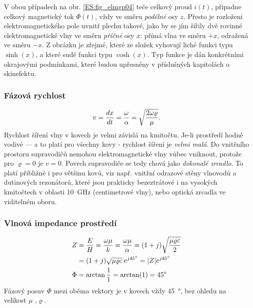         V obou případech na obr. \ref{ES:fig_elmgp04} teče celkový proud \(i(t)\), připadne celkový 
        magnetický tok \(\Phi(t)\), vždy ve směru \emph{podélné} osy \(z\). Přesto je rozloženi 
        elektromagnetického pole uvnitř plechu takové, jako by se jím šířily dvě rovinné 
        elektromagnetické vlny ve směru \emph{příčné} osy \(x\): přímá vlna ve směru \(+x\), 
        odražená ve směru \(-x\). Z obrázku je zřejmé, které ze složek vyhovují liché funkci typu 
        \( 
        \sinh(x)\), a které sudé funkci typu \(\cosh(x)\). Typ funkce je dán konkrétními okrajovými 
        podmínkami, které budou upřesněny v příslušných kapitolách o skinefektu.
       
        \subsubsection{Fázová rychlost}
          \begin{equation}\label{ES:eq_elmagp51}
            v = \dfrac{d x}{d t} = \frac{\omega}{\alpha} 
              = \sqrt{\dfrac{2\omega\varrho}{\mu}}.
          \end{equation}
          Rychlost šíření vlny v kovech je velmi závislá na kmitočtu. Je-li prostředí hodně 
          vodivé — a to platí pro všechny kovy - rychlost šíření je \emph{velmi malá}. Do vnitřního 
          prostoru supravodičů nemohou elektromagnetické vlny vůbec vniknout, protože pro \(\varrho 
          = 0\) je \(v = 0\). Povrch supravodiče se tedy chová jako \emph{dokonalé zrcadlo}. To 
          platí přibližně i pro většinu kovů, viz např. vnitřní odrazové stěny vlnovodů a 
          dutinových rezonátorů, které jsou prakticky bezeztrátové i na vysokých kmitočtech v 
          oblasti \SI{10}{\GHz} (centimetrové vlny), nebo optická zrcadla ve viditelném oboru.

        \subsubsection{Vlnová impedance prostředí}
          \begin{subequations}
            \begin{align}
                Z &= \frac{E}{H} = \frac{\omega\mu}{k} 
                   = \frac{\omega\mu}{\alpha} 
                   = (1+j)\sqrt{\frac{\mu\varrho\varepsilon}{2}}                      \nonumber \\
                  &= (1+j)\sqrt{\mu\varrho\varepsilon}\,e^{j\SI{45}{\degree}}         
                   =  \lvert Z\rvert e^{j\SI{45}{\degree}}                      \label{ES:eq_elmagp51a} \\
             \Phi &= \arctan\frac{1}{1} 
                   = \arctan(1) 
                   = \SI{45}{\degree}                                   \label{ES:eq_elmagp51b} 
            \end{align}
          \end{subequations}
          Fázový posuv \(\Phi\) mezi oběma vektory je v kovech vždy \SI{45}{\degree}, bez ohledu na 
          velikost \(\mu\) ,\(\varrho\).
          
